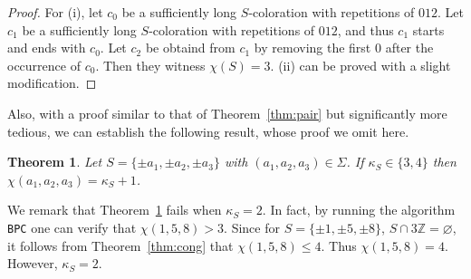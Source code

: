 \documentclass[11pt]{amsart}
\newtheorem{theorem}{Theorem}[section]
\newtheorem{proposition}[theorem]{Proposition}
\theoremstyle{definition}
\newtheorem{example}[theorem]{Example}
\def\Z{\mathbb{Z}}
\def\Z{\mathbb{Z}}
\begin{document}
\begin{proof} For (i), let $c_0$ be a sufficiently long $S$-coloration with repetitions of $012$. Let $c_1$ be a sufficiently long $S$-coloration with repetitions of $012$, and thus $c_1$ starts and ends with $c_0$. Let $c_2$ be obtaind from $c_1$ by removing the first $0$ after the occurrence of $c_0$. Then they witness $\chi(S)=3$. (ii) can be proved with a slight modification.
\end{proof}



Also, with a proof similar to that of Theorem~\ref{thm:pair} but significantly more tedious, we can establish the following result, whose proof we omit here.

\begin{theorem}\label{thm:triple} Let $S=\{\pm a_1, \pm a_2, \pm a_3\}$ with $(a_1, a_2, a_3)\in \Sigma$. If $\kappa_S\in\{3, 4\}$ then $\chi(a_1, a_2, a_3)=\kappa_S+1$.
\end{theorem}

We remark that Theorem~\ref{thm:triple} fails when $\kappa_S=2$. In fact, by running the algorithm {\tt BPC} one can verify that $\chi(1, 5,8)>3$. Since for $S=\{\pm 1, \pm 5, \pm 8\}$, $S\cap 3\Z=\varnothing$, it follows from Theorem~\ref{thm:cong} that $\chi(1, 5, 8)\leq 4$. Thus $\chi(1, 5,8)=4$. However, $\kappa_S=2$. 




\end{document}
